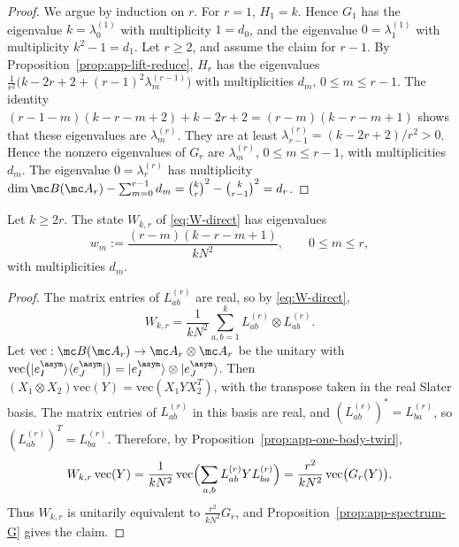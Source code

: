 \begin{proof}
We argue by induction on \(r\).  For \(r=1\), \(H_1=k\).  Hence \(G_1\)
has the eigenvalue \(k=\lambda_0^{(1)}\) with multiplicity \(1=d_0\), and
the eigenvalue \(0=\lambda_1^{(1)}\) with multiplicity \(k^2-1=d_1\).
Let \(r\geq2\), and assume the claim for \(r-1\).  By
Proposition~\ref{prop:app-lift-reduce}, \(H_r\) has the eigenvalues
\(\frac1{r^2}\bigl(k-2r+2+(r-1)^2\lambda_m^{(r-1)}\bigr)\) with
multiplicities \(d_m\), \(0\le m\le r-1\).  The identity
\((r-1-m)(k-r-m+2)+k-2r+2=(r-m)(k-r-m+1)\) shows that these eigenvalues
are \(\lambda_m^{(r)}\).  They are at least
\(\lambda_{r-1}^{(r)}=(k-2r+2)/r^2>0\).  Hence the nonzero eigenvalues
of \(G_r\) are \(\lambda_m^{(r)}\), \(0\le m\le r-1\), with multiplicities
\(d_m\).  The eigenvalue \(0=\lambda_r^{(r)}\) has multiplicity
\(\dim\mc B(\mc A_r)-\sum_{m=0}^{r-1}d_m=\binom kr^2-\binom k{r-1}^2=d_r\).
\end{proof}
 
\begin{proposition}
\label{prop:app-spectrum-W}
Let \(k\ge2r\).  The state \(W_{k,r}\) of \eqref{eq:W-direct} has eigenvalues
\begin{equation}
    w_m:=\frac{(r-m)(k-r-m+1)}{kN^2},
    \qquad 0\le m\le r,
\end{equation}
with multiplicities \(d_m\).
\end{proposition}
 
\begin{proof}
The matrix entries of \(L_{ab}^{(r)}\) are real, so by
\eqref{eq:W-direct},
\begin{equation}
    W_{k,r}=\frac1{kN^2}\sum_{a,b=1}^kL_{ab}^{(r)}\otimes L_{ab}^{(r)}.
\end{equation}
Let \(\mathrm{vec}:\mc B(\mc A_r)\to\mc A_r\otimes\mc A_r\) be the unitary
with \(\mathrm{vec}\bigl(|e_I^{\asym}\rangle\langle e_J^{\asym}|\bigr)
=|e_I^{\asym}\rangle\otimes|e_J^{\asym}\rangle\).  Then
\((X_1\otimes X_2)\mathrm{vec}(Y)=\mathrm{vec}(X_1YX_2^T)\), with the
transpose taken in the real Slater basis.  The matrix entries of
\(L_{ab}^{(r)}\) in this basis are real, and
\((L_{ab}^{(r)})^*=L_{ba}^{(r)}\), so \((L_{ab}^{(r)})^T=L_{ba}^{(r)}\).
Therefore, by Proposition~\ref{prop:app-one-body-twirl},
\begin{equation}
    W_{k,r}\,\mathrm{vec}(Y)
    =\frac1{kN^2}\,\mathrm{vec}\Bigl(\sum_{a,b}L_{ab}^{(r)}YL_{ba}^{(r)}\Bigr)
    =\frac{r^2}{kN^2}\,\mathrm{vec}\bigl(G_r(Y)\bigr).
\end{equation}
Thus \(W_{k,r}\) is unitarily equivalent to \(\frac{r^2}{kN^2}G_r\), and
Proposition~\ref{prop:app-spectrum-G} gives the claim.
\end{proof}
 
